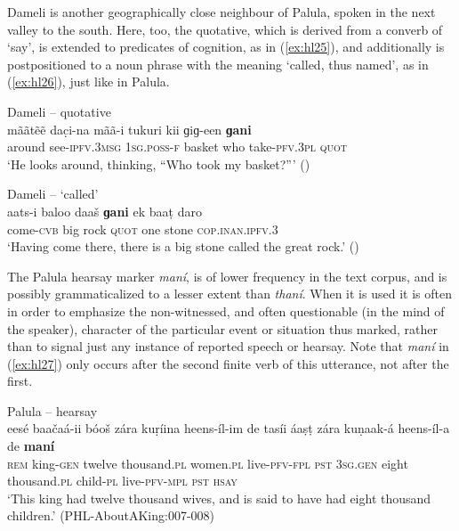 \documentclass[output=paper]{langsci/langscibook}
\begin{document}
Dameli is another geographically close neighbour of Palula, spoken in the next valley to the south. Here, too, the quotative, which is derived from a converb of ‘say’, is extended to predicates of cognition, as in ‎(\ref{ex:hl25}), and additionally is postpositioned to a noun phrase with the meaning ‘called, thus named’, as in ‎(\ref{ex:hl26}), just like in Palula. 

\newpage
\begin{exe}
\ex Dameli -- quotative \label{ex:hl25}\\
	\gll mããtẽẽ dac̣i-na mãã-i tukuri kii ɡiɡ-een \textbf{ɡani}\\
	around see-\textsc{ipfv}.3\textsc{msg} 1\textsc{sg}.\textsc{poss}-\textsc{f} basket who take-\textsc{pfv}.3\textsc{pl} \textsc{quot}\\
	\trans ‘He looks around, thinking, “Who took my basket?”’ (\citealt[176]{Perder2013}) 
\end{exe}

\begin{exe}
\ex Dameli – ‘called’ \label{ex:hl26}\\
	\gll aats-i baloo daaš \textbf{ɡani} ek baaṭ daro\\
	come-\textsc{cvb} big rock \textsc{quot} one stone \textsc{cop}.\textsc{inan}.\textsc{ipfv}.3\\
	\trans ‘Having come there, there is a big stone called the great rock.’ (\citealt[177]{Perder2013}) 
\end{exe}

The Palula hearsay marker \textit{maní}, is of lower frequency in the text corpus, and is possibly grammaticalized to a lesser extent than \textit{thaní}. When it is used it is often in order to emphasize the non-witnessed, and often questionable (in the mind of the speaker), character of the particular event or situation thus marked, rather than to signal just any instance of reported speech or hearsay. Note that \textit{maní} in ‎(\ref{ex:hl27}) only occurs after the second finite verb of this utterance, not after the first.

\begin{exe}
\ex Palula -- hearsay \label{ex:hl27}\\
	\gll eesé baačaá-ii bóoš zára kuṛíina heens-íl-im de tasíi áaṣṭ zára kuṇaak-á heens-íl-a de \textbf{maní}\\
	\textsc{rem} king-\textsc{gen} twelve thousand.\textsc{pl} women.\textsc{pl} live-\textsc{pfv}-\textsc{fpl} \textsc{pst} 3\textsc{sg}.\textsc{gen} eight thousand.\textsc{pl} child-\textsc{pl} live-\textsc{pfv}-\textsc{mpl} \textsc{pst} \textsc{hsay}\\
	\trans ‘This king had twelve thousand wives, and is said to have had eight thousand children.’ (PHL-AboutAKing:007-008) 
\end{exe}
\end{document}
